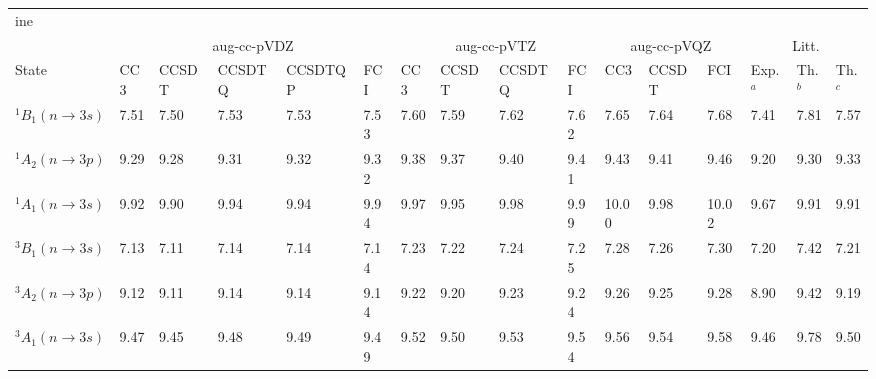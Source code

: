 \newcommand{\TDDFT}{TD-DFT}
\newcommand{\CASSCF}{CASSCF}
\newcommand{\CASPT}{CASPT2}
\newcommand{\ADC}[1]{ADC(#1)}
\newcommand{\CC}[1]{CC#1}
\newcommand{\CCSD}{CCSD}
\newcommand{\EOMCCSD}{EOM-CCSD}
\newcommand{\CCSDT}{CCSDT}
\newcommand{\CCSDTQ}{CCSDTQ}
\newcommand{\CCSDTQP}{CCSDTQP}
\newcommand{\CI}{CI}
\newcommand{\sCI}{sCI}
\newcommand{\exCI}{FCI}
\newcommand{\FCI}{FCI}

\newcommand{\AVDZ}{aug-cc-pVDZ}
\newcommand{\AVTZ}{aug-cc-pVTZ}
\newcommand{\DAVTZ}{d-aug-cc-pVTZ}
\newcommand{\AVQZ}{aug-cc-pVQZ}
\newcommand{\DAVQZ}{d-aug-cc-pVQZ}
\newcommand{\TAVQZ}{t-aug-cc-pVQZ}
\newcommand{\AVPZ}{aug-cc-pV5Z}
\newcommand{\DAVPZ}{d-aug-cc-pV5Z}
\newcommand{\PopleDZ}{6-31+G(d)}

\newcommand{\pis}{\pi^\star}
\newcommand{\Ryd}{\mathrm{R}}

\begin{tabular}{l|p{.6cm}p{1.1cm}p{1.4cm}p{1.7cm}p{.9cm}|p{.6cm}p{1.1cm}p{1.4cm}p{.9cm}|p{.6cm}p{1.1cm}p{.9cm}|p{.7cm}p{.7cm}p{.7cm}}
	ine 
			 \multicolumn{16}{c}{Water}\\
			& \multicolumn{5}{c}{\AVDZ} & \multicolumn{4}{c}{\AVTZ}& \multicolumn{3}{c}{\AVQZ} & \multicolumn{3}{c}{Litt.}\\
	State 	& {\CC{3}} & {\CCSDT} & {\CCSDTQ} & {\CCSDTQP} & {\exCI} & {\CC{3}} & {\CCSDT} & {\CCSDTQ}  & {\exCI}& {\CC{3}} & {\CCSDT}   & {\exCI} & Exp.$^a$ & Th.$^b$ & Th.$^c$\\
	$^1B_1 (n \rightarrow 3s)$ 	&7.51&7.50&7.53&7.53&7.53	&7.60&7.59&7.62&7.62	&7.65	&7.64	&7.68	&7.41 &7.81&7.57\\
	$^1A_2 (n \rightarrow 3p)$ 	&9.29&9.28&9.31&9.32&9.32	&9.38&9.37&9.40&9.41	&9.43	&9.41	&9.46	&9.20 &9.30&9.33\\
	$^1A_1 (n \rightarrow 3s)$ 	&9.92&9.90&9.94&9.94&9.94	&9.97&9.95&9.98&9.99	&10.00	&9.98	&10.02	&9.67 &9.91&9.91\\
	$^3B_1 (n \rightarrow 3s)$ 	&7.13&7.11&7.14&7.14&7.14	&7.23&7.22&7.24&7.25	&7.28	&7.26	&7.30	&7.20 &7.42&7.21\\
	$^3A_2 (n \rightarrow 3p)$ 	&9.12&9.11&9.14&9.14&9.14	&9.22&9.20&9.23&9.24	&9.26	&9.25	&9.28	&8.90 &9.42&9.19\\
	$^3A_1 (n \rightarrow 3s)$ 	&9.47&9.45&9.48&9.49&9.49	&9.52&9.50&9.53&9.54	&9.56	&9.54	&9.58	&9.46 &9.78&9.50\\
\end{tabular}